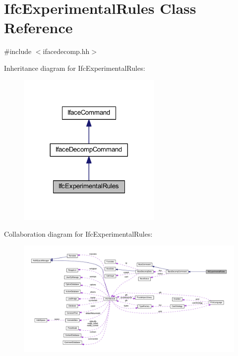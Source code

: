 \hypertarget{class_ifc_experimental_rules}{}\section{Ifc\+Experimental\+Rules Class Reference}
\label{class_ifc_experimental_rules}


{\ttfamily \#include $<$ifacedecomp.\+hh$>$}



Inheritance diagram for Ifc\+Experimental\+Rules\+:
\nopagebreak
\begin{figure}[H]
\begin{center}
\leavevmode
\includegraphics[width=197pt]{class_ifc_experimental_rules__inherit__graph}
\end{center}
\end{figure}


Collaboration diagram for Ifc\+Experimental\+Rules\+:
\nopagebreak
\begin{figure}[H]
\begin{center}
\leavevmode
\includegraphics[width=350pt]{class_ifc_experimental_rules__coll__graph}
\end{center}
\end{figure}
